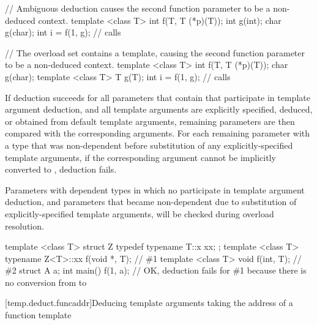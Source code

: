 \pnum
\begin{example}
\begin{codeblock}
// Ambiguous deduction causes the second function parameter to be a non-deduced context.
template <class T> int f(T, T (*p)(T));
int g(int);
char g(char);
int i = f(1, g);    // calls 
\end{codeblock}
\end{example}

\pnum
\begin{example}
\begin{codeblock}
// The overload set contains a template, causing the second function parameter to be a non-deduced context.
template <class T> int f(T, T (*p)(T));
char g(char);
template <class T> T g(T);
int i = f(1, g);    // calls 
\end{codeblock}
\end{example}

\pnum
If deduction succeeds for all parameters that contain
 that participate in template argument
deduction, and all template arguments are explicitly specified, deduced,
or obtained from default template arguments, remaining parameters are then
compared with the corresponding arguments. For each remaining parameter
 with a type that was non-dependent before substitution of any
explicitly-specified template arguments, if the corresponding argument
 cannot be implicitly converted to , deduction fails.
\begin{note}
Parameters with dependent types in which no 
participate in template argument deduction, and parameters that became
non-dependent due to substitution of explicitly-specified template arguments,
will be checked during overload resolution.
\end{note}
\begin{example}
\begin{codeblock}
  template <class T> struct Z {
    typedef typename T::x xx;
  };
  template <class T> typename Z<T>::xx f(void *, T);    // \#1
  template <class T> void f(int, T);                    // \#2
  struct A {} a;
  int main() {
    f(1, a);        // OK, deduction fails for \#1 because there is no conversion from  to 
  }
\end{codeblock}
\end{example}

[temp.deduct.funcaddr]{Deducing template arguments taking the address of a function template}

